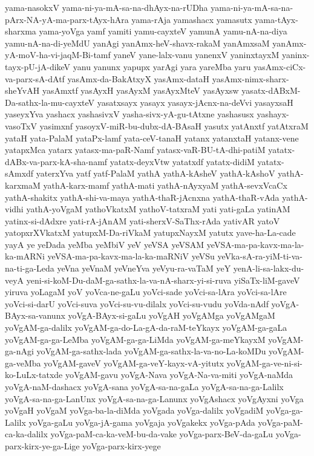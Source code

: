 {yama-nasokxV
yama-ni-ya-mA-sa-na-dhAyx-na-rUDha
yama-ni-ya-mA-sa-na-pArx-NA-yA-ma-parx-tAyx-hAra
yama-rAja
yamashacx
yamasutx
yama-tAyx-sharxma
yama-yoVga
yamf
yamiti
yamu-cayxteV
yamunA
yamu-nA-na-diya
yamu-nA-na-di-yeMdU
yanAgi
yanAmx-heV-shavx-rakaM
yanAmxsaM
yanAmx-yA-moV-ha-vi-jaqM-Bi-tamf
yaneV
yane-lalx-vanu
yanenxV
yaninxtayxM
yaninx-tayx-pU-jA-dikeV
yanu
yanunx
yapupx
yarAgi
yara
yareMba
yaru
yasAmx-ciCx-va-parx-sA-dAtf
yasAmx-da-BakAtxyX
yasAmx-dataH
yasAmx-nimx-sharx-sheYvAH
yasAmxtf
yasAyxH
yasAyxM
yasAyxMteV
yasAyxsw
yasatx-dABxM-Da-sathx-la-mu-cayxteV
yasatxsayx
yasayx
yasayx-jAcnx-na-deVvi
yasayxsaH
yaseyxYva
yashacx
yashasivxV
yasha-sivx-yA-gu-tAtxne
yashasusx
yashayx-vasoTxV
yasimxnf
yasoyxV-miR-bu-dubx-dA-BAsaH
yasutx
yatAnxtf
yatAtxraM
yataH
yata-PalaM
yataPx-lamf
yata-ceV-tanaH
yatanx
yatanxtaH
yatanx-vene
yatapxMca
yatarx
yatasx-ma-paR-Namf
yatasx-vaR-BU-tA-dhi-patiM
yatatx-dABx-va-parx-kA-sha-namf
yatatx-deyxVtw
yatatxdf
yatatx-didiM
yatatx-sAmxdf
yaterxYva
yatf
yatf-PalaM
yathA
yathA-kAsheV
yathA-kAshoV
yathA-karxmaM
yathA-karx-mamf
yathA-mati
yathA-nAyxyaM
yathA-sevxVcaCx
yathA-shakitx
yathA-shi-va-maya
yathA-thaR-jAcnxna
yathA-thaR-vAda
yathA-vidhi
yathA-yoVgaM
yathoVkatxM
yathoV-tatxraM
yati
yati-gaLa
yatinAM
yatinx-si-dAdxre
yati-rA-jAnAM
yati-sherxV-SaThx-rAda
yativAR
yatoV
yatopxrXVkatxM
yatupxM-Da-riVkaM
yatupxNayxM
yatutx
yave-ha-La-cade
yayA
ye
yeDada
yeMba
yeMbiV
yeV
yeVSA
yeVSAM
yeVSA-ma-pa-kavx-ma-la-ka-mARNi
yeVSA-ma-pa-kavx-ma-la-ka-maRNiV
yeVSu
yeVka-sA-ra-yiM-ti-va-na-ti-ga-Leda
yeVna
yeVnaM
yeVneYva
yeVyu-ra-vaTaM
yeY
yenA-li-sa-lakx-du-veyA
yeni-si-koM-Du-daM-ga-sathx-la-va-nA-sharx-yi-si-ruva
yiSaTx-liM-gaveV
yiruva
yoLagaM
yoV
yoVca-ne-gaLu
yoVci-sade
yoVci-sa-lAra
yoVci-sa-lAre
yoVci-si-darU
yoVci-suva
yoVci-su-vu-dilalx
yoVci-su-vudu
yoVda-nAdf
yoVgA-BAyx-sa-vanunx
yoVgA-BAyx-si-gaLu
yoVgAH
yoVgAMga
yoVgAMgaM
yoVgAM-ga-dalilx
yoVgAM-ga-do-La-gA-da-raM-teYkayx
yoVgAM-ga-gaLa
yoVgAM-ga-ga-LeMba
yoVgAM-ga-ga-LiMda
yoVgAM-ga-meYkayxM
yoVgAM-ga-nAgi
yoVgAM-ga-sathx-lada
yoVgAM-ga-sathx-la-va-no-La-koMDu
yoVgAM-ga-veMba
yoVgAM-gaveV
yoVgAM-ga-veY-kayx-vA-yitutx
yoVgAM-ga-ve-ni-si-ko-LuLx-tatxde
yoVgAM-gavu
yoVgA-Nava
yoVgA-Na-va-miti
yoVgA-naMda
yoVgA-naM-dashacx
yoVgA-sana
yoVgA-sa-na-gaLa
yoVgA-sa-na-ga-Lalilx
yoVgA-sa-na-ga-LanUnx
yoVgA-sa-na-ga-Lanunx
yoVgAshacx
yoVgAyxni
yoVga
yoVgaH
yoVgaM
yoVga-ba-la-diMda
yoVgada
yoVga-dalilx
yoVgadiM
yoVga-ga-Lalilx
yoVga-gaLu
yoVga-jA-gama
yoVgaja
yoVgakekx
yoVga-pAda
yoVga-paM-ca-ka-dalilx
yoVga-paM-ca-ka-veM-bu-da-vake
yoVga-parx-BeV-da-gaLu
yoVga-parx-kirx-ye-ga-Lige
yoVga-parx-kirx-yege
}
